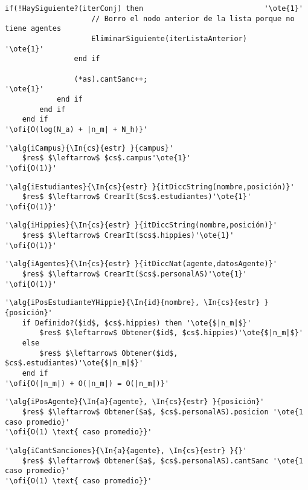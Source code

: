 \begin{lstlisting}[mathescape]
	   			if(!HaySiguiente?(iterConj) then							'\ote{1}'
	   				// Borro el nodo anterior de la lista porque no tiene agentes
	   				EliminarSiguiente(iterListaAnterior)					'\ote{1}'
	   			end if
	   			
	   			(*as).cantSanc++;											'\ote{1}'
	   		end if
	   	end if
	end if
'\ofi{O(log(N_a) + |n_m| + N_h)}'
\end{lstlisting}

\begin{lstlisting}[mathescape]
'\alg{iCampus}{\In{cs}{estr} }{campus}'
	$res$ $\leftarrow$ $cs$.campus'\ote{1}'
'\ofi{O(1)}'
\end{lstlisting}

\begin{lstlisting}[mathescape]
'\alg{iEstudiantes}{\In{cs}{estr} }{itDiccString(nombre,posición)}'
	$res$ $\leftarrow$ CrearIt($cs$.estudiantes)'\ote{1}'
'\ofi{O(1)}'
\end{lstlisting}

\begin{lstlisting}[mathescape]
'\alg{iHippies}{\In{cs}{estr} }{itDiccString(nombre,posición)}'
	$res$ $\leftarrow$ CrearIt($cs$.hippies)'\ote{1}'
'\ofi{O(1)}'
\end{lstlisting}

\begin{lstlisting}[mathescape]
'\alg{iAgentes}{\In{cs}{estr} }{itDiccNat(agente,datosAgente)}'
	$res$ $\leftarrow$ CrearIt($cs$.personalAS)'\ote{1}'
'\ofi{O(1)}'
\end{lstlisting}

\begin{lstlisting}[mathescape]
'\alg{iPosEstudianteYHippie}{\In{id}{nombre}, \In{cs}{estr} }{posición}'
	if Definido?($id$, $cs$.hippies) then '\ote{$|n_m|$}'
		$res$ $\leftarrow$ Obtener($id$, $cs$.hippies)'\ote{$|n_m|$}'
	else
		$res$ $\leftarrow$ Obtener($id$, $cs$.estudiantes)'\ote{$|n_m|$}'
	end if
'\ofi{O(|n_m|) + O(|n_m|) = O(|n_m|)}'
\end{lstlisting}

\begin{lstlisting}[mathescape]
'\alg{iPosAgente}{\In{a}{agente}, \In{cs}{estr} }{posición}'
	$res$ $\leftarrow$ Obtener($a$, $cs$.personalAS).posicion '\ote{1 caso promedio}'
'\ofi{O(1) \text{ caso promedio}}'
\end{lstlisting}

\begin{lstlisting}[mathescape]
'\alg{iCantSanciones}{\In{a}{agente}, \In{cs}{estr} }{}'
	$res$ $\leftarrow$ Obtener($a$, $cs$.personalAS).cantSanc '\ote{1 caso promedio}'
'\ofi{O(1) \text{ caso promedio}}'
\end{lstlisting}

